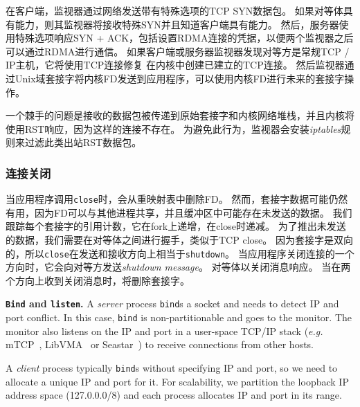 在客户端，监视器通过网络发送带有特殊选项的TCP SYN数据包。
如果对等体具有\sys {}能力，则其监视器将接收特殊SYN并且知道客户端具有\sys {}能力。
然后，服务器使用特殊选项响应SYN + ACK，包括设置RDMA连接的凭据，以便两个监视器之后可以通过RDMA进行通信。
如果客户端或服务器监视器发现对等方是常规TCP / IP主机，它将使用TCP连接修复 \cite {tcp-connection-repair}在内核中创建已建立的TCP连接。
然后监视器通过Unix域套接字将内核FD发送到应用程序，\libipc {}可以使用内核FD进行未来的套接字操作。


一个棘手的问题是接收的数据包被传递到原始套接字和内核网络堆栈，并且内核将使用RST响应，因为这样的连接不存在。
为避免此行为，监视器会安装\emph {iptables}规则来过滤此类出站RST数据包。

%	


\subsubsection{连接关闭}



当应用程序调用\texttt {close}时，\libipc {}会从重映射表中删除FD。
然而，套接字数据可能仍然有用，因为FD可以与其他进程共享，并且缓冲区中可能存在未发送的数据。
我们跟踪每个套接字的引用计数，它在fork上递增，在close时递减。
为了推出未发送的数据，我们需要在对等体之间进行握手，类似于TCP close。
因为套接字是双向的，所以\texttt {close}在发送和接收方向上相当于\texttt {shutdown}。
当应用程序关闭连接的一个方向时，它会向对等方发送\emph {shutdown message}。
对等体以关闭消息响应。
当\libipc {}在两个方向上收到关闭消息时，将删除套接字。


\iffalse

\textbf{\texttt{Bind} and \texttt{listen}.}
A \emph{server} process \texttt{bind}s a socket and needs to detect IP and port conflict. In this case, \texttt{bind} is non-partitionable and goes to the monitor. The monitor also listens on the IP and port in a user-space TCP/IP stack (\textit{e.g.} mTCP~\cite{jeong2014mtcp}, LibVMA~\cite{libvma} or Seastar~\cite{seastar}) to receive connections from other hosts.

A \emph{client} process typically \texttt{bind}s without specifying IP and port, so we need to allocate a unique IP and port for it. For scalability, we partition the loopback IP address space (127.0.0.0/8) and each process allocates IP and port in its range.

